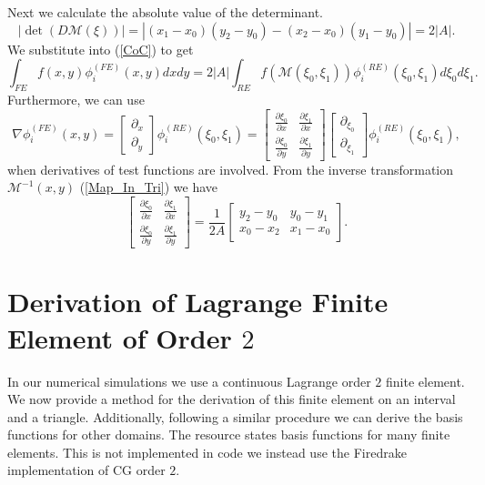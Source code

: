 \documentclass[12pt]{ociamthesis}
\begin{document}
Next we calculate the absolute value of the determinant. 
\begin{equation}
|\det(D\mathcal{M}(\xi))| = |(x_1-x_0)(y_2-y_0)-(x_2-x_0)(y_1-y_0)| = 2|A|.
\end{equation}
We substitute into (\ref{CoC}) to get
\begin{equation}
\int_{FE}f(x,y)\phi_i^{(FE)}(x,y)dxdy =
2|A|\int_{RE}f(\mathcal{M}(\xi_0,\xi_1)) \phi_i^{(RE)}(\xi_0,\xi_1)d\xi_0d\xi_1.
\end{equation}
Furthermore, we can use
\begin{equation}
\nabla \phi_i^{(FE)}(x,y) = 
\left [
\begin{matrix}
\partial_x \\
\partial_y
\end{matrix}
\right]
\phi_i^{(RE)}(\xi_0, \xi_1) =
\left[
\begin{matrix}
\frac{\partial \xi_0}{\partial x} & 
\frac{\partial \xi_1}{\partial x} \\
\frac{\partial \xi_0}{\partial y} &
\frac{\partial \xi_1}{\partial y}
\end{matrix}
\right] 
\left [
\begin{matrix}
\partial_{\xi_0} \\
\partial_{\xi_1}
\end{matrix}
\right ]
\phi_i^{(RE)}(\xi_0, \xi_1),
\end{equation}
when derivatives of test functions are involved. From the inverse transformation $\mathcal{M}^{-1}(x, y)$ (\ref{Map_In_Tri}) we have
\begin{equation}
\left[
\begin{matrix}
\frac{\partial \xi_0}{\partial x} & 
\frac{\partial \xi_1}{\partial x} \\
\frac{\partial \xi_0}{\partial y} &
\frac{\partial \xi_1}{\partial y}
\end{matrix}
\right] = \frac{1}{2A}
\left[
\begin{matrix}
y_2-y_0 & y_0-y_1 \\
x_0-x_2 & x_1-x_0 
\end{matrix}
\right].
\end{equation}

\section{Derivation of Lagrange Finite Element of Order $2$} \label{LDEF}
In our numerical simulations we use a continuous Lagrange order $2$ finite element. We now provide a method for the derivation of this finite element on an interval and a triangle. Additionally, following a similar procedure we can derive the basis functions for other domains. The resource \cite{defelement} states basis functions for many finite elements. This is not implemented in code we instead use the Firedrake implementation of CG order $2$. 
\end{document}
